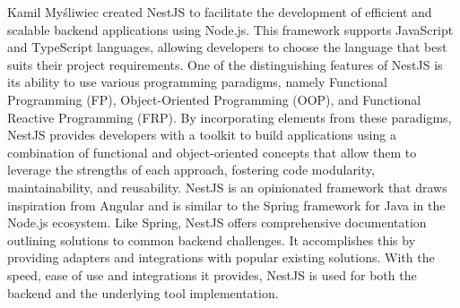 Kamil Myśliwiec created NestJS to facilitate the development of efficient and scalable backend applications using Node.js. This framework supports JavaScript and TypeScript languages, allowing developers to choose the language that best suits their project requirements.
One of the distinguishing features of NestJS is its ability to use various programming paradigms, namely Functional Programming (FP), Object-Oriented Programming (OOP), and Functional Reactive Programming (FRP). By incorporating elements from these paradigms, NestJS provides developers with a toolkit to build applications using a combination of functional and object-oriented concepts that allow them to leverage the strengths of each approach, fostering code modularity, maintainability, and reusability.
NestJS is an opinionated framework that draws inspiration from Angular and is similar to the Spring framework for Java in the Node.js ecosystem. Like Spring, NestJS offers comprehensive documentation outlining solutions to common backend challenges. It accomplishes this by providing adapters and integrations with popular existing solutions.
With the speed, ease of use and integrations it provides, NestJS is used for both the backend and the underlying tool implementation.
